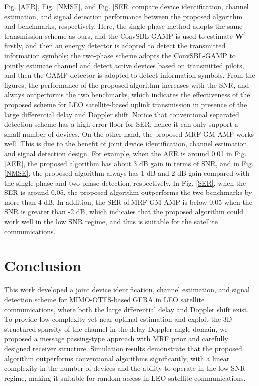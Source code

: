 \documentclass[conference]{IEEEtran}
\begin{document}
	 Fig. \ref{AER}, Fig. \ref{NMSE}, and Fig. \ref{SER} compare device identification, channel estimation, and signal detection performance between the proposed algorithm and benchmarks, respectively. Here, the single-phase method adopts the same transmission scheme as ours, and the ConvSBL-GAMP \cite{smm1} is used to estimate $\mathbf W^l$ firstly, and then an energy detector is adopted to detect the transmitted information symbols; the two-phase scheme adopts the ConvSBL-GAMP to jointly estimate channel and detect active devices based on transmitted pilots, and then the GAMP detector is adopted to detect information symbols. From the figures, the performance of the proposed algorithm increases with the SNR, and always outperforms the two benchmarks, which indicates the effectiveness of the proposed scheme for LEO satellite-based uplink transmission in presence of the large differential delay and Doppler shift. Notice
	that conventional separated detection scheme has a high
	error floor for SER; hence it can only support a small number of devices. On the other hand, the proposed MRF-GM-AMP works well. This is due to the benefit of joint
	device identification, channel estimation, and signal detection
	design.
	For example, when the AER is around 0.01 in Fig. \ref{AER}, the proposed algorithm has about 3 dB gain in terms of SNR, and in Fig. \ref{NMSE}, the
	proposed algorithm always has 1 dB and 2 dB gain compared with the single-phase and two-phase detection, respectively. In Fig. \ref{SER}, when the SER is around 0.05, the proposed algorithm outperforms the two benchmarks by more than 4 dB. In addition, the SER of MRF-GM-AMP is below 0.05 when the SNR is greater than -2 dB, which indicates that the proposed algorithm could work well in the low SNR regime, and thus is suitable for the satellite communications.
	
	\section{Conclusion}
	This work developed a joint device identification, channel estimation, and signal detection scheme for MIMO-OTFS-based GFRA in LEO satellite communications, where both the large differential delay and Doppler shift exist. To provide low-complexity yet near-optimal estimation and exploit the 3D-structured sparsity of the channel in the delay-Doppler-angle domain, we proposed a message passing-type approach with MRF prior and carefully designed receiver structure. Simulation results demonstrate that the proposed algorithm outperforms conventional algorithms significantly, with a linear complexity in the number of devices and the ability to operate in the low SNR regime, making it suitable for random access in LEO satellite communications.
	
	
	
	\vspace{12pt}
	
	
\end{document}
